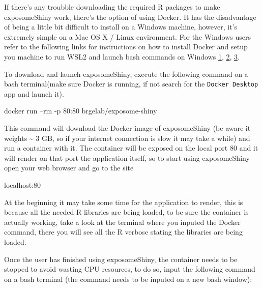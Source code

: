 \documentclass[
]{book}
\newenvironment{Shaded}{\begin{snugshade}}{\end{snugshade}}
\newcommand{\ExtensionTok}[1]{#1}
\newcommand{\NormalTok}[1]{#1}
\begin{document}
If there's any troubble downloading the required R packages to make exposomeShiny work, there's the option of using Docker. It has the disadvantage of being a little bit difficult to install on a Windows machine, however, it's extremely simple on a Mac OS X / Linux environment. For the Windows users refer to the following links for instructions on how to install Docker and setup you machine to run WSL2 and launch bash commands on Windows \href{https://docs.docker.com/docker-for-windows/install-windows-home/}{1}, \href{https://blog.nillsf.com/index.php/2020/02/17/setting-up-wsl2-windows-terminal-and-oh-my-zsh/}{2}, \href{https://docs.docker.com/docker-for-windows/wsl/}{3}.

To download and launch exposomeShiny, execute the following command on a bash terminal(make sure Docker is running, if not search for the \texttt{Docker\ Desktop} app and launch it).

\begin{Shaded}
\begin{Highlighting}[]
\ExtensionTok{docker}\NormalTok{ run --rm -p 80:80 brgelab/exposome-shiny}
\end{Highlighting}
\end{Shaded}

This command will download the Docker image of exposomeShiny (be aware it weights \textasciitilde{} 3 GB, so if your internet connection is slow it may take a while) and run a container with it. The container will be exposed on the local port 80 and it will render on that port the application itself, so to start using exposomeShiny open your web browser and go to the site

\begin{Shaded}
\begin{Highlighting}[]
\ExtensionTok{localhost}\NormalTok{:80}
\end{Highlighting}
\end{Shaded}

At the beginning it may take some time for the application to render, this is because all the needed R libraries are being loaded, to be sure the container is actually working, take a look at the terminal where you inputed the Docker command, there you will see all the R verbose stating the libraries are being loaded.

Once the user has finished using exposomeShiny, the container needs to be stopped to avoid wasting CPU resources, to do so, input the following command on a bash terminal (the command needs to be inputed on a new bash window):
\end{document}
